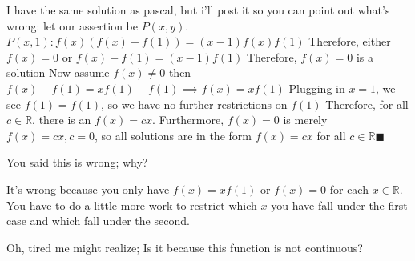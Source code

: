 \begin{solution}
	I have the same solution as pascal, but i'll post it so you can point out what's wrong:
let our assertion be $P(x,y)$. 
$P(x,1): f(x)(f(x)-f(1))=(x-1)f(x)f(1)$
Therefore, either $f(x)=0$ or $f(x)-f(1)=(x-1)f(1)$
Therefore, $f(x)=0$ is a solution
Now assume $f(x) \not=0$
then $f(x)-f(1)=xf(1)-f(1) \implies f(x)=xf(1)$
Plugging in $x=1$, we see $f(1)=f(1)$, so we have no further restrictions on $f(1)$
Therefore, for all $c \in \mathbb{R}$, there is an $f(x)=cx$.
Furthermore, $f(x)=0$ is merely $f(x)=cx, c=0$, so all solutions are in the form $f(x)=cx$ for all $c \in \mathbb{R} \blacksquare$

You said this is wrong; why?
\end{solution}



\begin{solution}
	It's wrong because you only have $f(x) = xf(1)$ or $f(x) = 0$ for each $x \in \mathbb{R}$. You have to do a little more work to restrict which $x$ you have fall under the first case and which fall under the second.
\end{solution}



\begin{solution}
	Oh, tired me might realize; Is it because this function is not continuous?
\end{solution}



